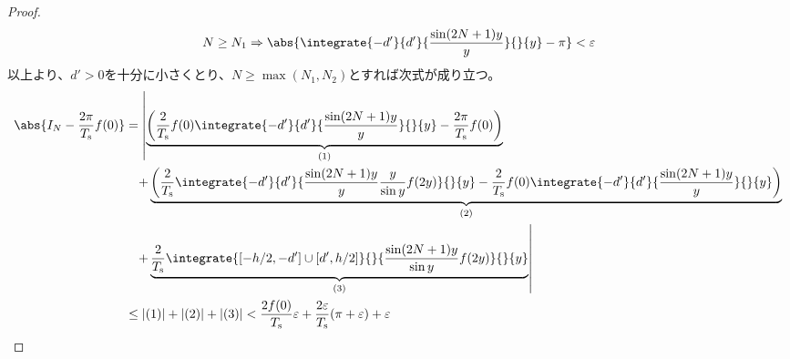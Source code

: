 \begin{proof}
            \[ N\geq N_1 \Rightarrow \abs{\integrate{-d'}{d'}{\frac{\sin(2N+1)y}{y}}{}{y} - \pi} < \varepsilon \]
            以上より、$d'>0$を十分に小さくとり、$N\geq\max(N_1,N_2)$とすれば次式が成り立つ。
            \begin{align*}
                \abs{I_N - \frac{2\pi}{T_\text{s}} f(0)} &= \left|\underbrace{\left(\frac{2}{T_\text{s}}f(0)\integrate{-d'}{d'}{\frac{\sin(2N+1)y}{y}}{}{y} - \frac{2\pi}{T_\text{s}} f(0)\right)}_{(1)} \right. \\
                &\phantom{=} \left.+ \underbrace{\left(\frac{2}{T_\text{s}}\integrate{-d'}{d'}{\frac{\sin(2N+1)y}{y}\frac{y}{\sin y}f(2y)}{}{y} - \frac{2}{T_\text{s}}f(0)\integrate{-d'}{d'}{\frac{\sin(2N+1)y}{y}}{}{y}\right)}_{(2)} \right. \\
                &\phantom{=} \left.+ \underbrace{\frac{2}{T_\text{s}}\integrate{[-h/2,-d']\cup[d',h/2]}{}{\frac{\sin(2N+1)y}{\sin y}f(2y)}{}{y}}_{(3)}\right| \\
                &\leq |(1)| + |(2)| + |(3)| < \frac{2f(0)}{T_\text{s}}\varepsilon + \frac{2\varepsilon}{T_\text{s}}(\pi+\varepsilon) + \varepsilon
            \end{align*}
        \end{proof}
